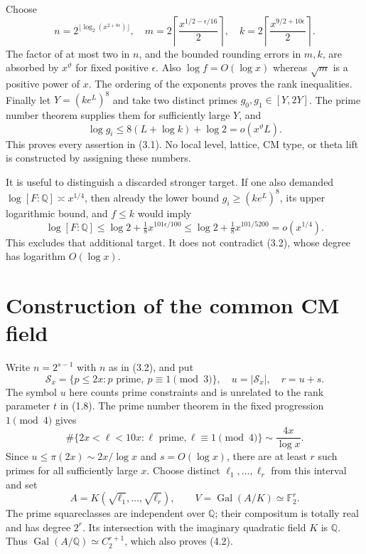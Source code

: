 \documentclass[11pt]{article}
\theoremstyle{remark}\newtheorem{remark}[theorem]{Remark}
\newcommand{\Q}{\mathbb Q}
\newcommand{\F}{\mathbb F}
\newcommand{\Gal}{\operatorname{Gal}}
\begin{document}
Choose
\[
 n=2^{\lfloor\log_2(x^{2+8\epsilon})\rfloor},\quad
 m=2\left\lceil\frac{x^{1/2-\epsilon/16}}2\right\rceil,
 \quad k=2\left\lceil\frac{x^{9/2+10\epsilon}}2\right\rceil.
                                                        \tag{3.2}
\]
The factor of at most two in $n$, and the bounded rounding errors
in $m,k$, are absorbed by $x^\vartheta$ for fixed positive
$\epsilon$. Also $\log f=O(\log x)$ whereas $\sqrt m$ is a positive
power of $x$. The ordering of the exponents proves the rank
inequalities. Finally let $Y=(ke^L)^8$ and take two distinct primes
$g_0,g_1\in[Y,2Y]$. The prime number theorem supplies them for
sufficiently large $Y$, and
\[
 \log g_i\le8(L+\log k)+\log2=o(x^\vartheta L).
                                                        \tag{3.3}
\]
This proves every assertion in (3.1). No local level, lattice,
CM type, or theta lift is constructed by assigning these numbers.

It is useful to distinguish a discarded stronger target. If one
also demanded $\log[F:\Q]\asymp x^{1/4}$, then already the lower
bound $g_i\ge(ke^L)^8$, its upper logarithmic bound, and $f\le k$
would imply
\[
 \log[F:\Q]\le\log2+\tfrac18x^{101\epsilon/100}
             \le\log2+\tfrac18x^{101/5200}=o(x^{1/4}).
                                                        \tag{3.4}
\]
This excludes that additional target. It does not contradict
(3.2), whose degree has logarithm $O(\log x)$.

\section{Construction of the common CM field}

Write $n=2^{s-1}$ with $n$ as in (3.2), and put
\[
 \mathcal S_x=\{p\le2x:p\text{ prime},\ p\equiv1\pmod3\},
 \quad u=|\mathcal S_x|,
 \quad r=u+s.
                                                        \tag{4.1}
\]
The symbol $u$ here counts prime constraints and is unrelated to
the rank parameter $t$ in (1.8).
The prime number theorem in the fixed progression $1\pmod4$
gives
\[
 \#\{2x<\ell<10x:\ell\text{ prime},\ell\equiv1\pmod4\}
       \sim\frac{4x}{\log x}.
\]
Since $u\le\pi(2x)\sim2x/\log x$ and $s=O(\log x)$, there
are at least $r$ such primes for all sufficiently large $x$.
Choose distinct $\ell_1,\ldots,\ell_r$ from this interval and set
\[
 A=K(\sqrt{\ell_1},\ldots,\sqrt{\ell_r}),\qquad
 V=\Gal(A/K)\simeq\F_2^r.
                                                        \tag{4.2}
\]
The prime squareclasses are independent over $\Q$; their compositum
is totally real and has degree $2^r$. Its intersection with the
imaginary quadratic field $K$ is $\Q$. Thus
$\Gal(A/\Q)\simeq C_2^{r+1}$, which also proves (4.2).
\end{document}
